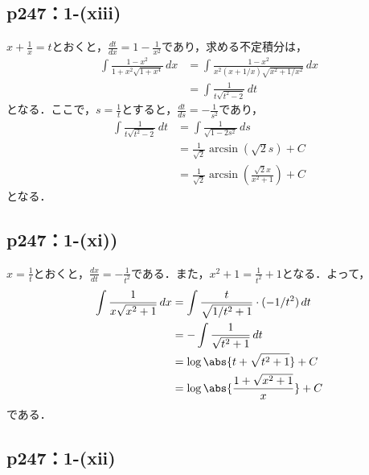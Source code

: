 \documentclass[uplatex,dvipdfmx,a4paper,10pt,fleqn]{jsarticle}
\begin{document}
\subsection*{p247：1-(xiii)}


\begin{tleftbar}
    $x+\frac{1}{x}=t$とおくと，$\frac{dt}{dx}=1-\frac{1}{x^2}$であり，求める不定積分は，
    \begin{align*} 
        \int \frac{1-x^2}{1+x^2\sqrt{1+x^4}} \, dx & = \int \frac{1-x^2}{x^2 (x+1/x)\sqrt{x^2 + 1/x^2}} \, dx \\
        & =\int \frac{1}{t\sqrt{t^2-2}} \, dt
    \end{align*}
    となる．ここで，$s=\frac{1}{t}$とすると，$\frac{dt}{ds}=-\frac{1}{s^2}$であり，
    \begin{align*} 
        \int \frac{1}{t \sqrt{t^2-2}} \, dt & = \int \frac{1}{\sqrt{1-2s^2}} \, ds \\
        & = \frac{1}{\sqrt{2}} \arcsin (\sqrt{2}s)+C \\
        & = \frac{1}{\sqrt{2}} \arcsin \left (\frac{\sqrt{2}x}{x^2+1} \right)+C
    \end{align*}
    となる．
\end{tleftbar}


\subsection*{p247：1-(xi))}


\begin{tleftbar}
    $x=\frac{1}{t}$とおくと，$\frac{dx}{dt}=-\frac{1}{t^2}$である．また，$x^2+1 = \frac{1}{t^2} +1$となる．よって，
    \begin{align*} 
        \int \frac{1}{x\sqrt{x^2+1}} \, dx & = \int \frac{t}{\sqrt{1/t^2+1}} \cdot (-1/t^2) \, dt \\
        & = -\int \frac{1}{\sqrt{t^2+1}} \, dt \\
        & = \log \abs{t+\sqrt{t^2+1}}+ C \\
        & = \log \abs{\frac{1+\sqrt{x^2+1}}{x}}+C
    \end{align*}
    である．
\end{tleftbar}


\subsection*{p247：1-(xii)}
\end{document}
